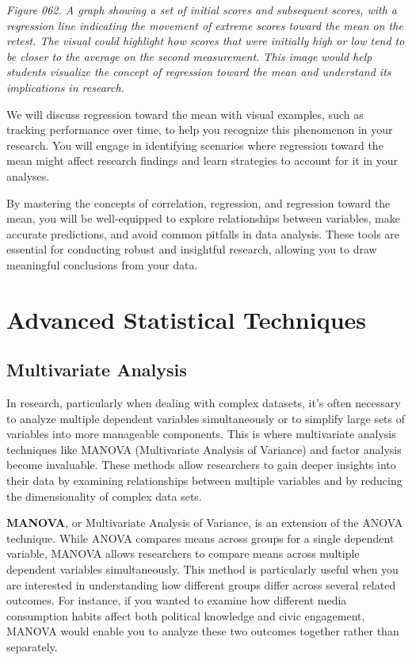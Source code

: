 \documentclass[
]{book}
\begin{document}
\emph{Figure 062. A graph showing a set of initial scores and subsequent scores, with a regression line indicating the movement of extreme scores toward the mean on the retest. The visual could highlight how scores that were initially high or low tend to be closer to the average on the second measurement. This image would help students visualize the concept of regression toward the mean and understand its implications in research.}

We will discuss regression toward the mean with visual examples, such as tracking performance over time, to help you recognize this phenomenon in your research. You will engage in identifying scenarios where regression toward the mean might affect research findings and learn strategies to account for it in your analyses.

By mastering the concepts of correlation, regression, and regression toward the mean, you will be well-equipped to explore relationships between variables, make accurate predictions, and avoid common pitfalls in data analysis. These tools are essential for conducting robust and insightful research, allowing you to draw meaningful conclusions from your data.

\section{Advanced Statistical Techniques}\label{advanced-statistical-techniques}

\subsection{Multivariate Analysis}\label{multivariate-analysis}

In research, particularly when dealing with complex datasets, it's often necessary to analyze multiple dependent variables simultaneously or to simplify large sets of variables into more manageable components. This is where multivariate analysis techniques like MANOVA (Multivariate Analysis of Variance) and factor analysis become invaluable. These methods allow researchers to gain deeper insights into their data by examining relationships between multiple variables and by reducing the dimensionality of complex data sets.

\textbf{MANOVA}, or Multivariate Analysis of Variance, is an extension of the ANOVA technique. While ANOVA compares means across groups for a single dependent variable, MANOVA allows researchers to compare means across multiple dependent variables simultaneously. This method is particularly useful when you are interested in understanding how different groups differ across several related outcomes. For instance, if you wanted to examine how different media consumption habits affect both political knowledge and civic engagement, MANOVA would enable you to analyze these two outcomes together rather than separately.
\end{document}
